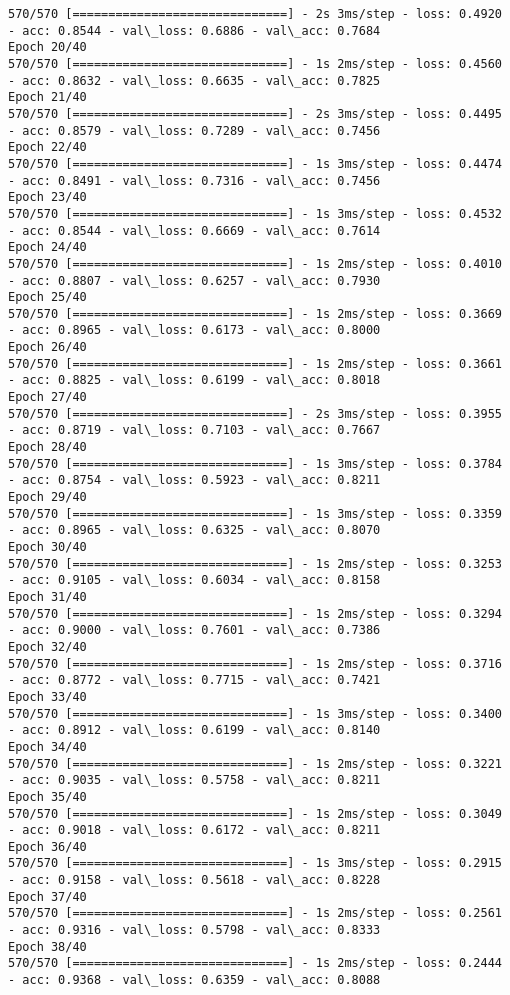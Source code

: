 \documentclass[11pt]{article}
\begin{document}
\begin{Verbatim}[commandchars=\\\{\}]
570/570 [==============================] - 2s 3ms/step - loss: 0.4920 - acc: 0.8544 - val\_loss: 0.6886 - val\_acc: 0.7684
Epoch 20/40
570/570 [==============================] - 1s 2ms/step - loss: 0.4560 - acc: 0.8632 - val\_loss: 0.6635 - val\_acc: 0.7825
Epoch 21/40
570/570 [==============================] - 2s 3ms/step - loss: 0.4495 - acc: 0.8579 - val\_loss: 0.7289 - val\_acc: 0.7456
Epoch 22/40
570/570 [==============================] - 1s 3ms/step - loss: 0.4474 - acc: 0.8491 - val\_loss: 0.7316 - val\_acc: 0.7456
Epoch 23/40
570/570 [==============================] - 1s 3ms/step - loss: 0.4532 - acc: 0.8544 - val\_loss: 0.6669 - val\_acc: 0.7614
Epoch 24/40
570/570 [==============================] - 1s 2ms/step - loss: 0.4010 - acc: 0.8807 - val\_loss: 0.6257 - val\_acc: 0.7930
Epoch 25/40
570/570 [==============================] - 1s 2ms/step - loss: 0.3669 - acc: 0.8965 - val\_loss: 0.6173 - val\_acc: 0.8000
Epoch 26/40
570/570 [==============================] - 1s 2ms/step - loss: 0.3661 - acc: 0.8825 - val\_loss: 0.6199 - val\_acc: 0.8018
Epoch 27/40
570/570 [==============================] - 2s 3ms/step - loss: 0.3955 - acc: 0.8719 - val\_loss: 0.7103 - val\_acc: 0.7667
Epoch 28/40
570/570 [==============================] - 1s 3ms/step - loss: 0.3784 - acc: 0.8754 - val\_loss: 0.5923 - val\_acc: 0.8211
Epoch 29/40
570/570 [==============================] - 1s 3ms/step - loss: 0.3359 - acc: 0.8965 - val\_loss: 0.6325 - val\_acc: 0.8070
Epoch 30/40
570/570 [==============================] - 1s 2ms/step - loss: 0.3253 - acc: 0.9105 - val\_loss: 0.6034 - val\_acc: 0.8158
Epoch 31/40
570/570 [==============================] - 1s 2ms/step - loss: 0.3294 - acc: 0.9000 - val\_loss: 0.7601 - val\_acc: 0.7386
Epoch 32/40
570/570 [==============================] - 1s 2ms/step - loss: 0.3716 - acc: 0.8772 - val\_loss: 0.7715 - val\_acc: 0.7421
Epoch 33/40
570/570 [==============================] - 1s 3ms/step - loss: 0.3400 - acc: 0.8912 - val\_loss: 0.6199 - val\_acc: 0.8140
Epoch 34/40
570/570 [==============================] - 1s 2ms/step - loss: 0.3221 - acc: 0.9035 - val\_loss: 0.5758 - val\_acc: 0.8211
Epoch 35/40
570/570 [==============================] - 1s 2ms/step - loss: 0.3049 - acc: 0.9018 - val\_loss: 0.6172 - val\_acc: 0.8211
Epoch 36/40
570/570 [==============================] - 1s 3ms/step - loss: 0.2915 - acc: 0.9158 - val\_loss: 0.5618 - val\_acc: 0.8228
Epoch 37/40
570/570 [==============================] - 1s 2ms/step - loss: 0.2561 - acc: 0.9316 - val\_loss: 0.5798 - val\_acc: 0.8333
Epoch 38/40
570/570 [==============================] - 1s 2ms/step - loss: 0.2444 - acc: 0.9368 - val\_loss: 0.6359 - val\_acc: 0.8088

\end{Verbatim}
\end{document}
